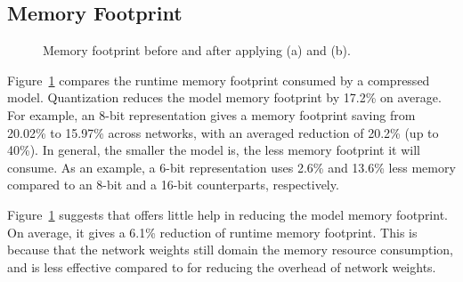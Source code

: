 \subsection{Memory Footprint}

\begin{figure}[!t]
\centering
{}
\hfill
\hspace{-2mm}
\hfill

\caption{Memory footprint before and after applying \quantization(a) and \pruning (b).} \label{fig:footprint}
\end{figure}

Figure~\ref{fig:footprint} compares the runtime memory footprint consumed by a compressed model. Quantization reduces the model memory
footprint by 17.2\% on average. For example, an 8-bit representation gives a memory footprint saving from 20.02\% to 15.97\% across
networks, with an averaged reduction of 20.2\% (up to 40\%). In general, the smaller the model is, the less memory footprint it will
consume. As an example, a 6-bit representation uses 2.6\% and 13.6\% less memory compared to an 8-bit and a 16-bit counterparts,
respectively.

Figure~\ref{fig:footprint} suggests that  \pruning offers little help in reducing the model memory footprint. On average, it gives a 6.1\%
reduction of runtime memory footprint. This is because that the network weights still domain the memory resource consumption, and \pruning
is less effective compared to \dquantization for reducing the overhead of network weights.




